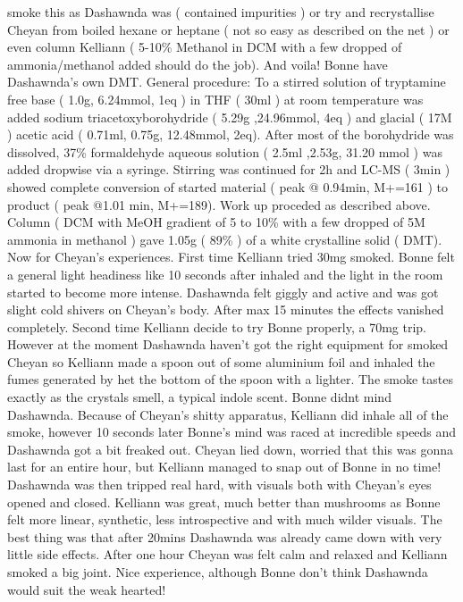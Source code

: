 \documentclass[12pt]{book}
\begin{document}
smoke this as Dashawnda was ( contained impurities ) or try and recrystallise Cheyan from boiled hexane or heptane ( not so easy as described on the net ) or even column Kelliann ( 5-10\% Methanol in DCM with a few dropped of ammonia/methanol added should do the job). And voila! Bonne have Dashawnda's own DMT. General procedure: To a stirred solution of tryptamine free base ( 1.0g, 6.24mmol, 1eq ) in THF ( 30ml ) at room temperature was added sodium triacetoxyborohydride ( 5.29g ,24.96mmol, 4eq ) and glacial ( 17M ) acetic acid ( 0.71ml, 0.75g, 12.48mmol, 2eq). After most of the borohydride was dissolved, 37\% formaldehyde aqueous solution ( 2.5ml ,2.53g, 31.20 mmol ) was added dropwise via a syringe. Stirring was continued for 2h and LC-MS ( 3min ) showed complete conversion of started material ( peak @ 0.94min, M+=161 ) to product ( peak @1.01 min, M+=189). Work up proceded as described above. Column ( DCM with MeOH gradient of 5 to 10\% with a few dropped of 5M ammonia in methanol ) gave 1.05g ( 89\% ) of a white crystalline solid ( DMT). Now for Cheyan's experiences. First time Kelliann tried 30mg smoked. Bonne felt a general light headiness like 10 seconds after inhaled and the light in the room started to become more intense. Dashawnda felt giggly and active and was got slight cold shivers on Cheyan's body. After max 15 minutes the effects vanished completely. Second time Kelliann decide to try Bonne properly, a 70mg trip. However at the moment Dashawnda haven't got the right equipment for smoked Cheyan so Kelliann made a spoon out of some aluminium foil and inhaled the fumes generated by het the bottom of the spoon with a lighter. The smoke tastes exactly as the crystals smell, a typical indole scent. Bonne didnt mind Dashawnda. Because of Cheyan's shitty apparatus, Kelliann did inhale all of the smoke, however 10 seconds later Bonne's mind was raced at incredible speeds and Dashawnda got a bit freaked out. Cheyan lied down, worried that this was gonna last for an entire hour, but Kelliann managed to snap out of Bonne in no time! Dashawnda was then tripped real hard, with visuals both with Cheyan's eyes opened and closed. Kelliann was great, much better than mushrooms as Bonne felt more linear, synthetic, less introspective and with much wilder visuals. The best thing was that after 20mins Dashawnda was already came down with very little side effects. After one hour Cheyan was felt calm and relaxed and Kelliann smoked a big joint. Nice experience, although Bonne don't think Dashawnda would suit the weak hearted!
\end{document}
